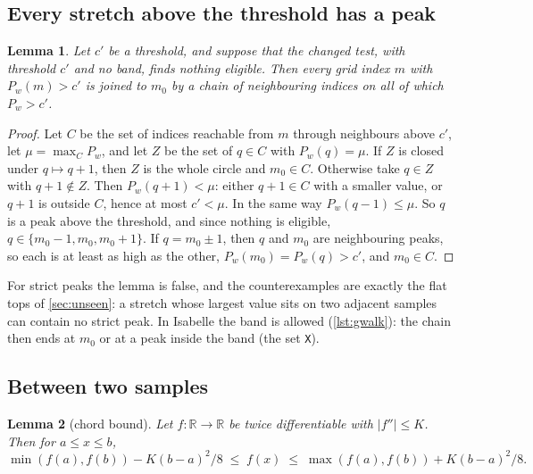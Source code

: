 \documentclass[11pt]{amsart}
\theoremstyle{plain}
\newtheorem{lemma}{Lemma}[section]
\theoremstyle{definition}
\newcommand{\thy}[1]{\texttt{#1}}
\newcommand{\R}{\mathbb{R}}
\begin{document}


\subsection{Every stretch above the threshold has a peak}

\begin{lemma}\label{lem:walk}
Let $c'$ be a threshold, and suppose that the changed test, with threshold $c'$ and no band, finds
nothing eligible.  Then every grid index $m$ with $P_w(m) > c'$ is joined to $m_0$ by a chain of
neighbouring indices on all of which $P_w > c'$.
\end{lemma}

\begin{proof}
Let $C$ be the set of indices reachable from $m$ through neighbours above $c'$, let
$\mu = \max_C P_w$, and let $Z$ be the set of $q \in C$ with $P_w(q) = \mu$.  If $Z$ is closed under
$q \mapsto q + 1$, then $Z$ is the whole circle and $m_0 \in C$.  Otherwise take $q \in Z$ with
$q + 1 \notin Z$.  Then $P_w(q+1) < \mu$: either $q + 1 \in C$ with a smaller value, or $q + 1$ is
outside $C$, hence at most $c' < \mu$.  In the same way $P_w(q-1) \le \mu$.  So $q$ is a peak above
the threshold, and since nothing is eligible, $q \in \{m_0 - 1, m_0, m_0 + 1\}$.  If $q = m_0 \pm 1$,
then $q$ and $m_0$ are neighbouring peaks, so each is at least as high as the other,
$P_w(m_0) = P_w(q) > c'$, and $m_0 \in C$.
\end{proof}

For strict peaks the lemma is false, and the counterexamples are exactly the flat tops of
\cref{sec:unseen}: a stretch whose largest value sits on two adjacent samples can contain no strict
peak.  In Isabelle the band is allowed (\cref{lst:gwalk}): the chain then ends at $m_0$ or at a peak
inside the band (the set \thy{X}).



\subsection{Between two samples}

\begin{lemma}[chord bound]\label{lem:chord}
Let $f \colon \R \to \R$ be twice differentiable with $|f''| \le K$.  Then for $a \le x \le b$,
\[ \min(f(a), f(b)) - K(b-a)^2/8 \;\le\; f(x) \;\le\; \max(f(a), f(b)) + K(b-a)^2/8 . \]
\end{lemma}
\end{document}
